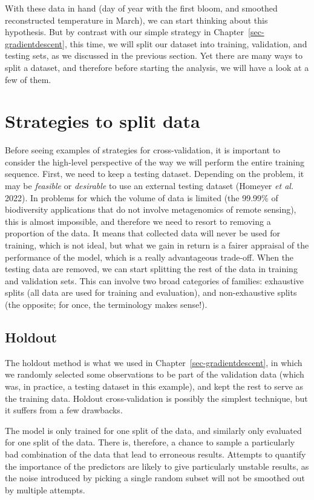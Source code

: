 \documentclass[
  letterpaper,
]{scrbook}
\begin{document}
With these data in hand (day of year with the first bloom, and smoothed
reconstructed temperature in March), we can start thinking about this
hypothesis. But by contrast with our simple strategy in
Chapter~\ref{sec-gradientdescent}, this time, we will split our dataset
into training, validation, and testing sets, as we discussed in the
previous section. Yet there are many ways to split a dataset, and
therefore before starting the analysis, we will have a look at a few of
them.

\section{Strategies to split data}\label{strategies-to-split-data}

Before seeing examples of strategies for cross-validation, it is
important to consider the high-level perspective of the way we will
perform the entire training sequence. First, we need to keep a testing
dataset. Depending on the problem, it may be \emph{feasible} or
\emph{desirable} to use an external testing dataset (Homeyer \emph{et
al.} 2022). In problems for which the volume of data is limited (the
99.99\% of biodiversity applications that do not involve metagenomics of
remote sensing), this is almost impossible, and therefore we need to
resort to removing a proportion of the data. It means that collected
data will never be used for training, which is not ideal, but what we
gain in return is a fairer appraisal of the performance of the model,
which is a really advantageous trade-off. When the testing data are
removed, we can start splitting the rest of the data in training and
validation sets. This can involve two broad categories of families:
exhaustive splits (all data are used for training and evaluation), and
non-exhaustive splits (the opposite; for once, the terminology makes
sense!).

\subsection{Holdout}\label{holdout}

The holdout method is what we used in Chapter~\ref{sec-gradientdescent},
in which we randomly selected some observations to be part of the
validation data (which was, in practice, a testing dataset in this
example), and kept the rest to serve as the training data. Holdout
cross-validation is possibly the simplest technique, but it suffers from
a few drawbacks.

The model is only trained for one split of the data, and similarly only
evaluated for one split of the data. There is, therefore, a chance to
sample a particularly bad combination of the data that lead to erroneous
results. Attempts to quantify the importance of the predictors are
likely to give particularly unstable results, as the noise introduced by
picking a single random subset will not be smoothed out by multiple
attempts.
\end{document}
